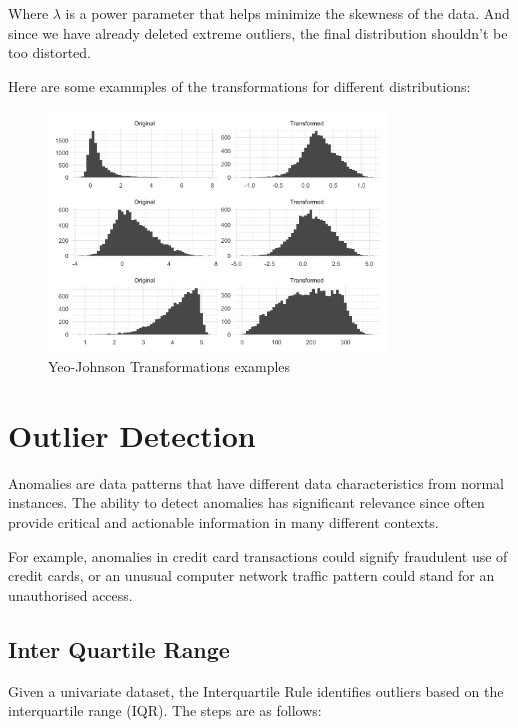 \documentclass[11pt,english,a4paper,hidelinks]{book}
\begin{document}
\noindent Where \(\lambda\) is a power parameter that helps minimize the skewness of the data. And since we have already deleted extreme outliers, the final distribution shouldn't be too distorted.

\vspace{0.5cm}

\noindent Here are some exammples of the transformations for different distributions:

\begin{figure}[H]
    \centering
    \includegraphics[width=0.8\textwidth]{images/code/transformations/yeo-johnson.png}
    \caption{Yeo-Johnson Transformations examples}
    \label{fig:yeo-johnson}
\end{figure}


\section{Outlier Detection}

Anomalies are data patterns that have different data characteristics from normal
instances. The ability to detect anomalies has significant relevance since often provide critical and actionable information in many different contexts.

\vspace{0.5cm}
\noindent For example, anomalies in credit card transactions could signify fraudulent use of
credit cards, or an unusual computer network traffic pattern could stand for an
unauthorised access.


\subsection{Inter Quartile Range}

Given a univariate dataset, the Interquartile Rule identifies outliers based on the interquartile range (IQR). The steps are as follows:
\end{document}
